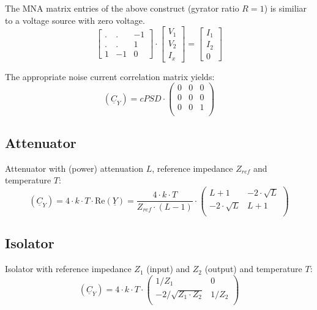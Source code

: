 The MNA matrix entries of the above construct (gyrator ratio $R=1$) is
similiar to a voltage source with zero voltage.
\begin{equation}
\begin{bmatrix}
.&.& -1\\
.&.& 1\\
1 & -1 & 0
\end{bmatrix}
\cdot
\begin{bmatrix}
V_{1}\\
V_{2}\\
I_x
\end{bmatrix}
=
\begin{bmatrix}
I_{1}\\
I_{2}\\
0
\end{bmatrix}
\end{equation}

The appropriate noise current correlation matrix yields:
\begin{equation}
(\underline{C}_Y) = cPSD \cdot
\begin{pmatrix}
 0 & 0 & 0\\
 0 & 0 & 0\\
 0 & 0 & 1\\
\end{pmatrix}
\end{equation}

\subsection{Attenuator}

Attenuator with (power) attenuation $L$, reference impedance $Z_{ref}$
and temperature $T$:
\begin{equation}
(\underline{C}_Y) = 4\cdot k\cdot T\cdot \textrm{Re}\left(\underline{Y}\right)
 = \frac{4\cdot k\cdot T}{Z_{ref}\cdot (L-1)} \cdot
\begin{pmatrix}
 L+1            & -2\cdot\sqrt{L} \\
-2\cdot\sqrt{L} &  L+1 \\
\end{pmatrix}
\end{equation}

\subsection{Isolator}

Isolator with reference impedance $Z_1$ (input) and $Z_2$ (output) and
temperature $T$:
\begin{equation}
(\underline{C}_Y) = 4\cdot k\cdot T\cdot
\begin{pmatrix}
 1/Z_1                 & 0 \\
-2/\sqrt{Z_1\cdot Z_2} &  1/Z_2 \\
\end{pmatrix}
\end{equation}

